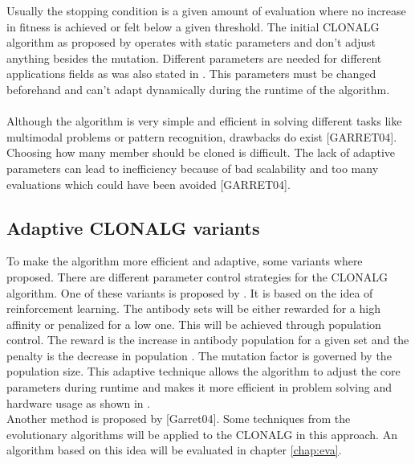 Usually the stopping condition is a given amount of evaluation where no increase in fitness is achieved or felt below a given threshold. The initial CLONALG algorithm as proposed by \cite{DEC02} operates with static parameters and don't adjust anything besides the mutation. Different parameters are needed for different applications fields as was also stated in \cite{DEC02}. This parameters must be changed beforehand and can't adapt dynamically during the runtime of the algorithm.\\\\
Although the algorithm is very simple and efficient in solving different tasks like multimodal problems or pattern recognition, drawbacks do exist [GARRET04]. Choosing how many member should be cloned is difficult. The lack of adaptive parameters can lead to inefficiency because of bad scalability and too many evaluations which could have been avoided [GARRET04].
\subsection{Adaptive CLONALG variants}
To make the algorithm more efficient and adaptive, some variants where proposed. There are different parameter control strategies for the CLONALG algorithm. One of these variants is proposed by \cite{RIFF09}. It is based on the idea of reinforcement learning. The antibody sets will be either rewarded for a high affinity or penalized for a low one. This will be achieved through population control. The reward is the increase in antibody population for a given set and the penalty is the decrease in population \cite{RIFF09}. The mutation factor is governed by the population size. This adaptive technique allows the algorithm to adjust the core parameters during runtime and makes it more efficient in problem solving and hardware usage as shown in \cite{RIFF09}.\\
Another method is proposed by [Garret04]. Some techniques from the evolutionary algorithms will be applied to the CLONALG in this approach. An algorithm based on this idea will be evaluated in chapter \ref{chap:eva}.
 




